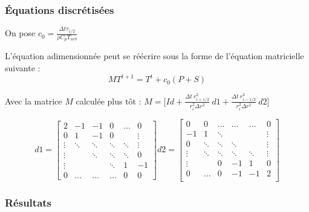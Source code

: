 \documentclass[10pt,a4paper]{article}
\numberwithin{equation}{section}
\begin{document}
\subsubsection{Équations discrétisées}

On pose $c_0 = \frac{\Delta t \tau_{1/2} }{\rho C_p T_{neb}}$ 

L'équation adimensionnée peut se réécrire sous la forme de l'équation matricielle suivante :
\begin{equation}
MT^{t+1} = T^t + c_0 ( P + S )
\end{equation}

Avec la matrice $M$ calculée plus tôt : 
$
M = \Big [ Id + \frac{\Delta t ~ r^2_{i+1/2}}{r^2_i \Delta r^2} ~ d1 + \frac{\Delta t ~ r^2_{i-1/2}}{r^2_i \Delta r^2} ~ d2  \Big]
$

\begin{equation}
d1=
\begin{bmatrix}
    2      & -1     & -1        & 0     &\dots      & 0 \\
    0      &  1     & -1        & 0     &           & \vdots  \\
    \vdots & \ddots & \ddots    &\ddots & \ddots    & \vdots \\
    \vdots &        & \ddots    &\ddots & \ddots    & 0 \\
    \vdots &        &           &\ddots & 1         &  -1 \\
    0      & \dots  & \dots     &\dots  & 0         &  0
\end{bmatrix}
d2=
\begin{bmatrix}
     0     & 0      & \dots  & \dots    &\dots      & 0 \\
    -1     & 1      & \ddots &          &           & \vdots  \\
    0      & \ddots & \ddots & \ddots   &           & \vdots \\
    \vdots & \ddots & \ddots & \ddots   & \ddots    & \vdots \\
    \vdots &        & 0      &  -1      &  1        & 0\\
    0      & \dots  & 0      &  -1      & -1        & 2 \\
\end{bmatrix}
\end{equation}


\subsubsection{Résultats}
\end{document}
